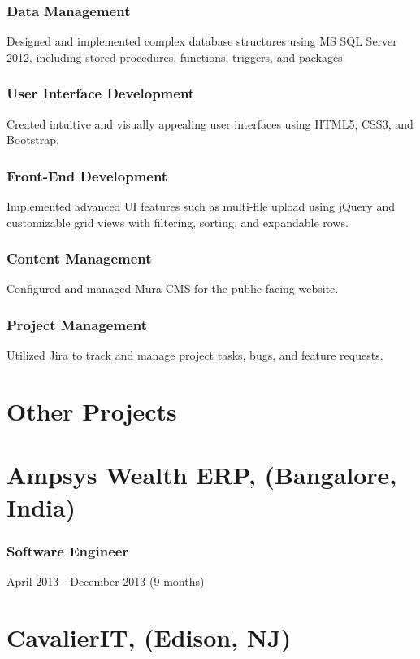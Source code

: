 \documentclass[letterpaper,9pt]{article}
\begin{document}
	\subsubsection{Data Management}{Designed and implemented complex database structures using MS SQL Server 2012, including stored procedures, functions, triggers, and packages.}
	\subsubsection{User Interface Development}{Created intuitive and visually appealing user interfaces using HTML5, CSS3, and Bootstrap.}
	\subsubsection{Front-End Development}{Implemented advanced UI features such as multi-file upload using jQuery and customizable grid views with filtering, sorting, and expandable rows.}
	\subsubsection{Content Management}{Configured and managed Mura CMS for the public-facing website.}
	\subsubsection{Project Management}{Utilized Jira to track and manage project tasks, bugs, and feature requests.}
	
	\pagebreak

    \section{Other Projects}

    
    \section{Ampsys Wealth ERP, (Bangalore, India)}
    \subsubsection{Software Engineer}{April 2013 - December 2013 (9 months)}

    
    \section{CavalierIT, (Edison, NJ)}
\end{document}

